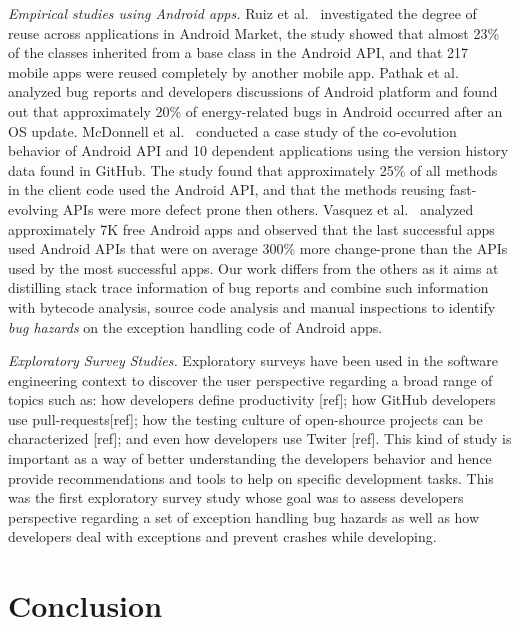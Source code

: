 \textit{Empirical studies using Android apps.} Ruiz et al.~\cite{Ruiz12}
investigated the degree of reuse across applications in Android Market, the
study showed that almost 23\% of the classes inherited from a base class in the
Android API, and that 217 mobile apps were reused completely by another mobile
app. Pathak et al.~\cite{Patha11} analyzed bug reports and developers
discussions of Android platform and found out that approximately 20\% of
energy-related bugs in Android occurred after an OS update. McDonnell et
al.~\cite{McDon13} conducted a case study of the co-evolution behavior of
Android API and 10 dependent applications using the version history data found
in GitHub. The study found that approximately 25\% of all methods in the client
code used the Android API, and that the methods reusing fast-evolving APIs were
more defect prone then others. Vasquez et al.~\cite{Linar13} analyzed
approximately 7K free Android apps and observed that the last successful apps
used Android APIs that were on average 300\% more change-prone than the APIs
used by the most successful apps. Our work differs from the others as it aims at
distilling stack trace information of bug reports and combine such information
with bytecode analysis, source code analysis and manual inspections
to identify \emph{bug hazards} on the exception handling code of Android apps.


\textit{Exploratory Survey Studies.} Exploratory surveys have been used in the software
engineering context to discover the user perspective regarding a broad range of 
topics such as: how developers define productivity [ref]; how GitHub developers use
pull-requests[ref]; how the testing culture of open-shource projects can be characterized [ref]; 
and even how developers use Twiter [ref]. This kind of study is important as a way of 
better understanding the developers behavior and hence provide recommendations and 
tools to help on specific development tasks. This was the first exploratory survey study whose
goal was to assess developers perspective regarding a set of exception handling bug hazards
as well as how developers deal with exceptions and prevent crashes while developing.
 




\section{Conclusion}
\label{sec:conc}

